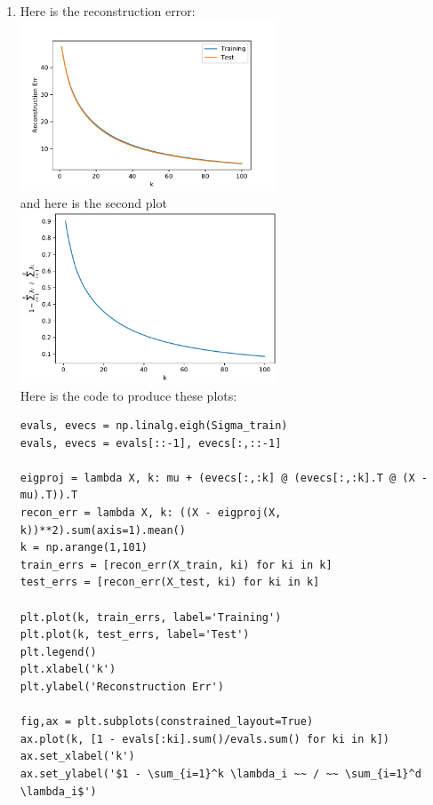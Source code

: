 \documentclass{article}
\begin{document}
\begin{enumerate}
        \newpage
        \item Here is the reconstruction error: \\
        \includegraphics[width=0.6\textwidth]{code/A7c_err.pdf} \\
        and here is the second plot \\
        \includegraphics[width=0.6\textwidth]{code/A7c_evals.pdf} \\
        Here is the code to produce these plots:
        \begin{verbatim}
evals, evecs = np.linalg.eigh(Sigma_train)
evals, evecs = evals[::-1], evecs[:,::-1]

eigproj = lambda X, k: mu + (evecs[:,:k] @ (evecs[:,:k].T @ (X - mu).T)).T
recon_err = lambda X, k: ((X - eigproj(X, k))**2).sum(axis=1).mean()
k = np.arange(1,101)
train_errs = [recon_err(X_train, ki) for ki in k]
test_errs = [recon_err(X_test, ki) for ki in k]

plt.plot(k, train_errs, label='Training')
plt.plot(k, test_errs, label='Test')
plt.legend()
plt.xlabel('k')
plt.ylabel('Reconstruction Err')

fig,ax = plt.subplots(constrained_layout=True)
ax.plot(k, [1 - evals[:ki].sum()/evals.sum() for ki in k])
ax.set_xlabel('k')
ax.set_ylabel('$1 - \sum_{i=1}^k \lambda_i ~~ / ~~ \sum_{i=1}^d \lambda_i$')
        \end{verbatim}


\end{enumerate}
\end{document}
